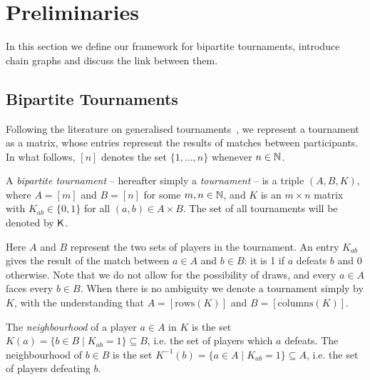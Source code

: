 \section{Preliminaries}
\label{tourn_sec_preliminaries}

In this section we define our framework for bipartite tournaments, introduce
chain graphs and discuss the link between them.

\subsection{Bipartite Tournaments}

Following the literature on generalised
tournaments~\cite{gonzalez2014paired, slutzki2005ranking,
csato2019impossibility}, we represent a tournament as a matrix, whose entries
represent the results of matches between participants. In what follows, $[n]$
denotes the set $\{1,\ldots,n\}$ whenever $n \in \mathbb{N}$.

\begin{definition}%

    A \emph{bipartite tournament} -- hereafter simply a \emph{tournament} -- is
    a triple $(A, B, K)$, where $A = [m]$ and $B = [n]$ for some $m, n \in \mathbb{N}$,
    and $K$ is an $m \times n$ matrix with $K_{ab} \in \{0, 1\}$ for all $(a,
    b) \in A \times B$. The set of all tournaments will be denoted by $\mathsf{K}$.

\end{definition}

Here $A$ and $B$ represent the two sets of players in the
tournament.\footnotemark{} An entry $K_{ab}$ gives the result of the match
between $a \in A$ and $b \in B$: it is 1 if $a$ defeats $b$ and 0 otherwise.
Note that we do not allow for the possibility of draws, and every $a \in A$
faces every $b \in B$.
%
When there is no ambiguity we denote a tournament simply by $K$, with the
understanding that $A = [\text{rows}(K)]$ and $B = [\text{columns}(K)]$.

The \emph{neighbourhood} of a player $a \in A$ in $K$ is the set $K(a) = \{b
\in B \mid K_{ab} = 1\} \subseteq B$, i.e. the set of players which $a$
defeats. The neighbourhood of $b \in B$ is the set $K^{-1}(b) = \{a \in A \mid
K_{ab} = 1\} \subseteq A$, i.e. the set of players defeating $b$.


